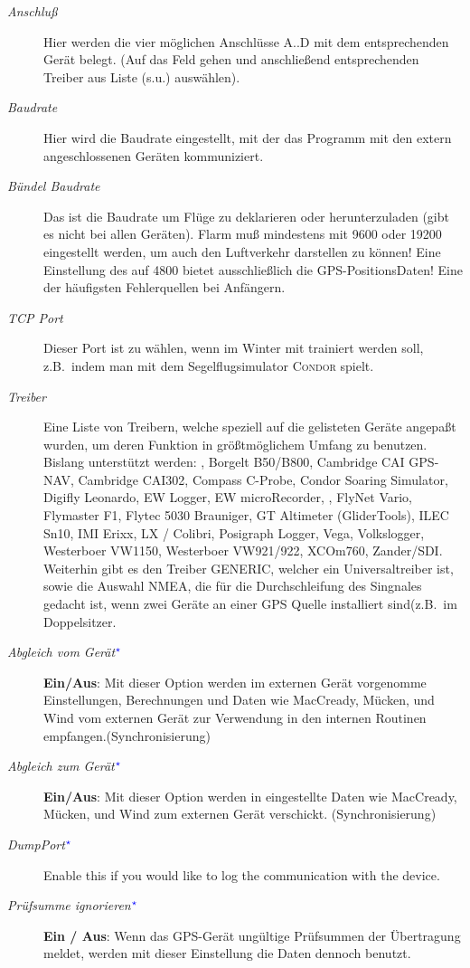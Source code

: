 \begin{description}
\item[\textit{Anschluß}]  Hier werden die vier möglichen Anschlüsse A..D mit dem entsprechenden Gerät belegt. (Auf das Feld gehen und anschließend entsprechenden Treiber aus Liste (s.u.) auswählen).
\item[\textit{Baudrate}]  Hier wird die Baudrate eingestellt, mit der das Programm mit den extern angeschlossenen Geräten kommuniziert.
\item[\textit{Bündel Baudrate}]  Das ist die Baudrate um Flüge zu deklarieren oder herunterzuladen (gibt es nicht bei allen Geräten).
\achtung Flarm muß  mindestens mit 9600 oder 19200 eingestellt werden, um auch den Luftverkehr darstellen zu können! Eine Einstellung des \fl auf 4800 bietet ausschließlich die GPS-PositionsDaten! Eine der häufigsten  Fehlerquellen bei Anfängern.
\item[\textit{TCP Port}]  Dieser Port ist zu wählen, wenn  im Winter mit \xc trainiert werden soll, z.B.\ indem man  mit dem
Segelflugsimulator \textsc{Condor} spielt.
\item[\textit{Treiber}] Eine Liste von Treibern, welche speziell auf die gelisteten Geräte angepaßt wurden, um deren Funktion in größtmöglichem Umfang zu benutzen.
Bislang unterstützt werden: \al, Borgelt B50/B800, Cambridge CAI GPS-NAV, Cambridge CAI302, Compass C-Probe, Condor Soaring Simulator, Digifly Leonardo,  EW Logger, EW microRecorder,
\fl, FlyNet Vario, Flymaster F1, Flytec 5030 Brauniger, GT Altimeter (GliderTools), ILEC Sn10, IMI Erixx, LX / Colibri, Posigraph Logger, Vega, Volkslogger, Westerboer VW1150, Westerboer VW921/922, XCOm760, Zander/SDI.
Weiterhin gibt es den Treiber GENERIC, welcher ein Universaltreiber ist, sowie die Auswahl NMEA, die für die Durchschleifung des Singnales gedacht ist, wenn zwei Geräte an einer GPS Quelle installiert sind(z.B.\ im Doppelsitzer.
\item[\textit{Abgleich vom Gerät$^{\textcolor{blue}{\star}}$}]  {\bf Ein/Aus}: Mit dieser Option werden im externen Gerät vorgenomme Einstellungen, Berechnungen und Daten wie MacCready, Mücken, und Wind vom externen Gerät zur Verwendung in den internen Routinen empfangen.(Synchronisierung)
\item[\textit{Abgleich zum Gerät$^{\textcolor{blue}{\star}}$}]  {\bf Ein/Aus}: Mit dieser Option werden in \xc eingestellte Daten wie MacCready, Mücken, und Wind zum externen Gerät verschickt. (Synchronisierung)
\item[\textit{DumpPort$^{\textcolor{blue}{\star}}$}]  Enable this if you would like to log the communication with the device.
\item[\textit{Prüfsumme ignorieren$^{\textcolor{blue}{\star}}$}] {\bf Ein / Aus}: Wenn das GPS-Gerät ungültige Prüfsummen der Übertragung meldet, werden mit
dieser Einstellung  die Daten dennoch benutzt.
\end{description}


